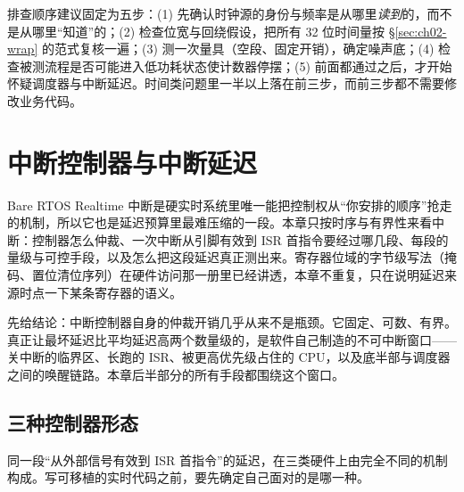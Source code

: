 \documentclass[12pt,a4paper,fontset=fandol]{ctexbook}
\newcommand{\Lang}[1]{\textsf{#1}}
\newcommand{\DomBare}{\Lang{Bare}}
\newcommand{\DomRtos}{\Lang{RTOS}}
\newcommand{\DomRT}{\Lang{Realtime}}
\begin{document}
排查顺序建议固定为五步：(1) 先确认时钟源的身份与频率是从哪里\emph{读到}的，而不是从哪里``知道''的；(2) 检查位宽与回绕假设，把所有 32 位时间量按 \S\ref{sec:ch02-wrap} 的范式复核一遍；(3) 测一次量具（空段、固定开销），确定噪声底；(4) 检查被测流程是否可能进入低功耗状态使计数器停摆；(5) 前面都通过之后，才开始怀疑调度器与中断延迟。时间类问题里一半以上落在前三步，而前三步都不需要修改业务代码。

\chapter{中断控制器与中断延迟}
\label{ch:ch03-interrupt-latency}

\DomBare{} \DomRtos{} \DomRT{} 中断是硬实时系统里唯一能把控制权从``你安排的顺序''抢走的机制，所以它也是延迟预算里最难压缩的一段。本章只按时序与有界性来看中断：控制器怎么仲裁、一次中断从引脚有效到 ISR 首指令要经过哪几段、每段的量级与可控手段，以及怎么把这段延迟真正测出来。寄存器位域的字节级写法（掩码、置位清位序列）在硬件访问那一册里已经讲透，本章不重复，只在说明延迟来源时点一下某条寄存器的语义。

先给结论：中断控制器自身的仲裁开销几乎从来不是瓶颈。它固定、可数、有界。真正让最坏延迟比平均延迟高两个数量级的，是软件自己制造的不可中断窗口——关中断的临界区、长跑的 ISR、被更高优先级占住的 CPU，以及底半部与调度器之间的唤醒链路。本章后半部分的所有手段都围绕这个窗口。

\section{三种控制器形态}

同一段``从外部信号有效到 ISR 首指令''的延迟，在三类硬件上由完全不同的机制构成。写可移植的实时代码之前，要先确定自己面对的是哪一种。
\end{document}
